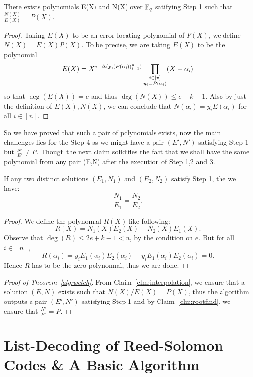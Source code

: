 \noindent
\begin{claim}[]	\label{clm:interpolation}
  	There exists polynomials E(X) and N(X) over $\mathbb{F}_q$ satifying Step 1 such that $\frac{N(X)}{E(X)}=P(X)$.
\end{claim}

\begin{proof}
	Taking $E(X)$ to be an error-locating polynomial of $P(X)$, we define $N(X) = E(X)P(X)$. To be precise, we are taking $E(X)$ to be the polynomial 
	\[
	E(X) = X^{e - \Delta(\mathbf{y}, (P(\alpha_i))_{i=1}^n)}\prod_{\substack{i\in[n]\\y_i = P(\alpha_i)}}(X - \alpha_i)
	\]
	so that $\deg(E(X)) = e$ and thus $\deg(N(X)) \leq e+k-1$. Also by just the definition of $E(X), N(X)$, we can conclude that $N(\alpha_i) = y_iE(\alpha_i)$ for all $i\in[n]$.
\end{proof}

So we have proved that such a pair of polynomials exists, now the main challenges lies for the Step 4 as we might have a pair $(E',N')$ satisfying Step 1 but $\frac{N'}{E'}\neq P$. Though the next claim solidifies the fact that we shall have the same polynomial from any pair (E,N) after the execution of Step 1,2 and 3.

\begin{claim}[]
	\label{clm:rootfind}
	If any two distinct solutions $(E_1,N_1)$ and $(E_2, N_2)$ satisfy Step 1, the we have:
	\[
		\frac{N_1}{E_1} = \frac{N_2}{E_2}.	
	\]
\end{claim}
\begin{proof}
	We define the polynomial $R(X)$ like following:
	\[
		R(X) = N_1(X)E_2(X) - N_2(X)E_1(X).
	\]
Observe that $\deg(R)\leq 2e + k - 1 < n$, by the condition on $e$. But for all $i\in[n]$, 
\[
	R(\alpha_i) = y_iE_1(\alpha_i)E_2(\alpha_i) - y_iE_1(\alpha_i)E_2(\alpha_i) = 0.
\]
Hence $R$ has to be the zero polynomial, thus we are done.


\end{proof}

\begin{proof}[Proof of Theorem~\ref{alg:welch}]
	From Claim~\ref{clm:interpolation}, we ensure that a solution $(E,N)$ exists such that $N(X)/E(X) = P(X)$, thus the algorithm outputs a pair $(E',N')$ satisfying Step 1 and by Claim~\ref{clm:rootfind}, we ensure that $\frac{N'}{E'} = P$.
\end{proof}


\section{List-Decoding of Reed-Solomon Codes \& A Basic Algorithm}

